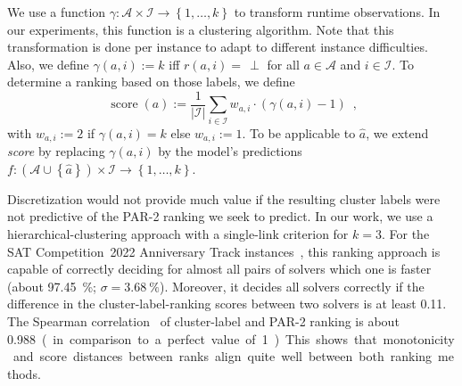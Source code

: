 \documentclass[runningheads]{llncs}
\begin{document}
We use a function $\gamma\!: {\mathcal{A} \times \mathcal{I}} \rightarrow \left\lbrace 1, \dots, k \right\rbrace$ to transform runtime observations.
In our experiments, this function is a clustering algorithm.
Note that this transformation is done per instance to adapt to different instance difficulties. 
Also, we define ${\gamma\!\left(a, i\right) := k}$ iff $r\!\left(a, i\right) = \,\perp$ for all $a \in \mathcal{A}$ and $i \in \mathcal{I}$.
To determine a ranking based on those labels, we define
\begin{equation}
  \operatorname{score}\!\left(a\right) := \frac{1}{|\mathcal{I}|} \sum_{i \in \mathcal{I}} w_{a,i} \cdot \left(\gamma\!\left(a, i\right) - 1\right) \enspace \textrm{,}
  \label{eq:rankingeq}
\end{equation}
with $w_{a,i} := 2$ if $\gamma\!\left(a, i\right) = k$ else $w_{a,i} := 1$.
To be applicable to $\hat{a}$, we extend \emph{score} by replacing $\gamma\!\left(a, i\right)$ by the model's predictions $f\!: \left(\mathcal{A} \cup \left\lbrace \hat{a} \right\rbrace\right) \times \mathcal{I} \rightarrow \left\lbrace 1, \dots, k \right\rbrace$.

Discretization would not provide much value if the resulting cluster labels were not predictive of the PAR-2 ranking we seek to predict.
In our work, we use a hierarchical-clustering approach with a single-link criterion for $k = 3$.
For the SAT Competition~2022 Anniversary Track instances~\cite{sat2022}, this ranking approach is capable of correctly deciding for almost all pairs of solvers which one is faster (about \SI{97.45}{\%}; $\sigma = \SI{3.68}{\%}$).
Moreover, it decides all solvers correctly if the difference in the cluster-label-ranking scores between two solvers is at least \SI{0.11}{}.
The Spearman correlation~\cite{de2016comparing} of cluster-label and PAR-2 ranking is about \SI{0.988} (in comparison to a perfect value of \SI{1}).
This shows that monotonicity and score distances between ranks align quite well between both ranking methods.

\end{document}

